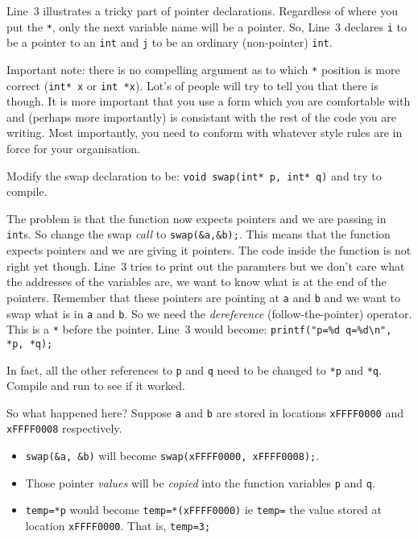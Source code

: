 Line~3 illustrates a tricky part of pointer declarations.
Regardless of where you put the \texttt{*}, only the next variable name will be a pointer.
So, Line~3 declares \texttt{i} to be a pointer to an \texttt{int} and \texttt{j} to be an ordinary (non-pointer) \texttt{int}.

Important note:
there is no compelling argument as to which \texttt{*} position is more correct (\texttt{int* x} or \texttt{int *x}).
Lot's of people will try to tell you that there is though.
It is more important that you use a form which you are comfortable with and (perhaps more importantly) is consistant with 
the rest of the code you are writing.
Most importantly, you need to conform with whatever style rules are in force for your organisation.

Modify the swap declaration to be:
\lstinline!void swap(int* p, int* q)!
and try to compile.

The problem is that the function now expects pointers and we are passing in \texttt{int}s.
So change the swap \emph{call} to \lstinline!swap(&a,&b);!.
This means that the function expects pointers and we are giving it pointers.
The code inside the function is not right yet though.
Line~3 tries to print out the paramters but we don't care what the addresses of the variables are, we want to know what is
at the end of the pointers.
Remember that these pointers are pointing at \texttt{a} and \texttt{b} and we want to swap what is in \texttt{a} and \texttt{b}.
So we need the \emph{dereference} (follow-the-pointer) operator.
This is a \texttt{*} before the pointer.
Line~3 would become:
\lstinline!printf("p=%d q=%d\n", *p, *q);!

In fact, all the other references to \texttt{p} and \texttt{q} need to be changed to \texttt{*p} and \texttt{*q}.
Compile and run to see if it worked.

So what happened here?
Suppose \texttt{a} and \texttt{b} are stored in locations \lstinline{xFFFF0000} and \lstinline{xFFFF0008} respectively.
\begin{itemize}
 \item \lstinline{swap(&a, &b)} will become \lstinline{swap(xFFFF0000, xFFFF0008);}.
 \item Those pointer \emph{values} will be \emph{copied} into the function variables \texttt{p} and \texttt{q}.
 \item \lstinline!temp=*p! would become \lstinline!temp=*(xFFFF0000)! ie \texttt{temp=} the value stored at location 
 \lstinline!xFFFF0000!.  That is, \lstinline!temp=3;!
\end{itemize}

